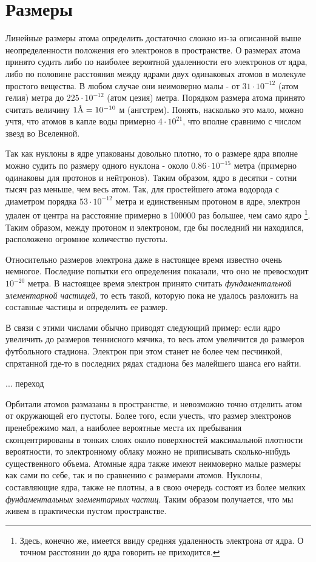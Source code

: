\section*{Размеры}

Линейные размеры атома определить достаточно сложно из-за описанной выше неопределенности положения его электронов в пространстве.
О размерах атома принято судить либо по наиболее вероятной удаленности его электронов от ядра, либо по половине расстояния между ядрами двух одинаковых атомов в молекуле простого вещества.
В любом случае они неимоверно малы - от $31\cdot 10^{-12}$ (атом гелия) метра до $225\cdot 10^{-12}$ (атом цезия) метра.
Порядком размера атома принято считать величину $1\mbox{\normalfont\AA} = 10^{-10}$ м (ангстрем).
Понять, насколько это мало, можно учтя, что атомов в капле воды примерно $4\cdot 10^{21}$, что вполне сравнимо с числом звезд во Вселенной.

Так как нуклоны в ядре упакованы довольно плотно, то о размере ядра вполне можно судить по размеру одного нуклона - около $0.86\cdot 10^{-15}$ метра (примерно одинаковы для протонов и нейтронов). 
Таким образом, ядро в десятки - сотни тысяч раз меньше, чем весь атом.
Так, для простейшего атома водорода с диаметром порядка $53\cdot 10^{-12}$ метра и единственным протоном в ядре, электрон удален от центра на расстояние примерно в 100000 раз большее, чем само ядро \footnote{%
    Здесь, конечно же, имеется ввиду средняя удаленность электрона от ядра.
    О точном расстоянии до ядра говорить не приходится.}.
Таким образом, между протоном и электроном, где бы последний ни находился, расположено огромное количество пустоты.

Относительно размеров электрона даже в настоящее время известно очень немногое.
Последние попытки его определения показали, что оно не превосходит $10^{-20}$ метра.
В настоящее время электрон принято считать \textit{фундаментальной элементарной частицей}, то есть такой, которую пока не удалось разложить на составные частицы и определить ее размер.

В связи с этими числами обычно приводят следующий пример: если ядро увеличить до размеров теннисного мячика, то весь атом увеличится до размеров футбольного стадиона.
Электрон при этом станет не более чем песчинкой, спрятанной где-то в последних рядах стадиона без малейшего шанса его найти.

... переход

Орбитали атомов размазаны в пространстве, и невозможно точно отделить атом от окружающей его пустоты.
Более того, если учесть, что размер электронов пренебрежимо мал, а наиболее вероятные места их пребывания сконцентрированы в тонких слоях около поверхностей максимальной плотности вероятности, то электронному облаку можно не приписывать сколько-нибудь существенного объема.
Атомные ядра также имеют неимоверно малые размеры как сами по себе, так и по сравнению с размерами атомов.
Нуклоны, составляющие ядра, также не плотны, а в свою очередь состоят из более мелких \textit{фундаментальных элементарных частиц}.
Таким образом получается, что мы живем в практически пустом пространстве.



